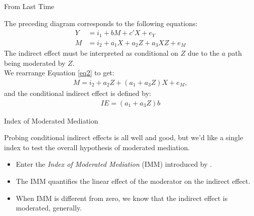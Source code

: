 \documentclass{beamer}
\newcommand{\va}[0]{\vspace{12pt}}
\newcommand{\vb}[0]{\vspace{6pt}}
\begin{document}
\begin{frame}{From Last Time}
  
  The preceding diagram corresponds to the following equations:
  \begin{align}
    Y &= i_1 + bM + c'X + e_Y\\
    M &= i_2 + a_1X + a_2Z + a_3XZ + e_M \label{eq2}
  \end{align}
  The indirect effect must be interpreted as conditional
  on $Z$ due to the $a$ path being moderated by $Z$.\\ 
  \va 
  We rearrange Equation \ref{eq2} to get:
  \begin{align*}
    M = i_2 + a_2Z + \left( a_1 + a_3Z \right)X + e_M,
  \end{align*}
  and the conditional indirect effect is defined by:
  \begin{align*}
    IE = \left(a_1 + a_3Z \right) b
  \end{align*}
  
\end{frame}


\begin{frame}{Index of Moderated Mediation}
  
  Probing conditional indirect effects is all well and good, but we'd
  like a single index to test the overall hypothesis of moderated
  mediation.
  \vb
  \begin{itemize}
    \item Enter the \emph{Index of Moderated Mediation} (IMM)
      introduced by \citet{hayes:2015}.
      \vb
    \item The IMM quantifies the linear effect of the moderator on the
      indirect effect.
      \vb
    \item When IMM is different from zero, we know that the indirect
      effect is moderated, generally.
  \end{itemize}
  
\end{frame}
\end{document}
